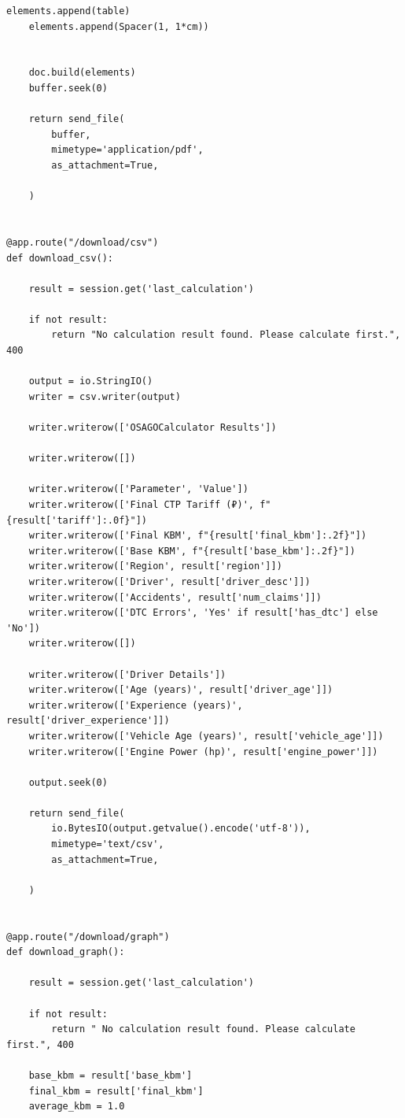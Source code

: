 \begin{lstlisting}[caption={Экспорт в PDF, CSV и PNG}, label={lst:export}    
    breakatwhitespace=true,
    breakindent=10pt,
    columns=fullflexible
]
    elements.append(table)
    elements.append(Spacer(1, 1*cm))
    
    
    doc.build(elements)
    buffer.seek(0)
    
    return send_file(
        buffer,
        mimetype='application/pdf',
        as_attachment=True,
     
    )


@app.route("/download/csv")
def download_csv():

    result = session.get('last_calculation')
    
    if not result:
        return "No calculation result found. Please calculate first.", 400
    
    output = io.StringIO()
    writer = csv.writer(output)
    
    writer.writerow(['OSAGOCalculator Results'])

    writer.writerow([])
    
    writer.writerow(['Parameter', 'Value'])
    writer.writerow(['Final CTP Tariff (₽)', f"{result['tariff']:.0f}"])
    writer.writerow(['Final KBM', f"{result['final_kbm']:.2f}"])
    writer.writerow(['Base KBM', f"{result['base_kbm']:.2f}"])
    writer.writerow(['Region', result['region']])
    writer.writerow(['Driver', result['driver_desc']])
    writer.writerow(['Accidents', result['num_claims']])
    writer.writerow(['DTC Errors', 'Yes' if result['has_dtc'] else 'No'])
    writer.writerow([])
    
    writer.writerow(['Driver Details'])
    writer.writerow(['Age (years)', result['driver_age']])
    writer.writerow(['Experience (years)', result['driver_experience']])
    writer.writerow(['Vehicle Age (years)', result['vehicle_age']])
    writer.writerow(['Engine Power (hp)', result['engine_power']])
    
    output.seek(0)
    
    return send_file(
        io.BytesIO(output.getvalue().encode('utf-8')),
        mimetype='text/csv',
        as_attachment=True,

    )


@app.route("/download/graph")
def download_graph():

    result = session.get('last_calculation')
    
    if not result:
        return " No calculation result found. Please calculate first.", 400
    
    base_kbm = result['base_kbm']
    final_kbm = result['final_kbm']
    average_kbm = 1.0
    

\end{lstlisting}
